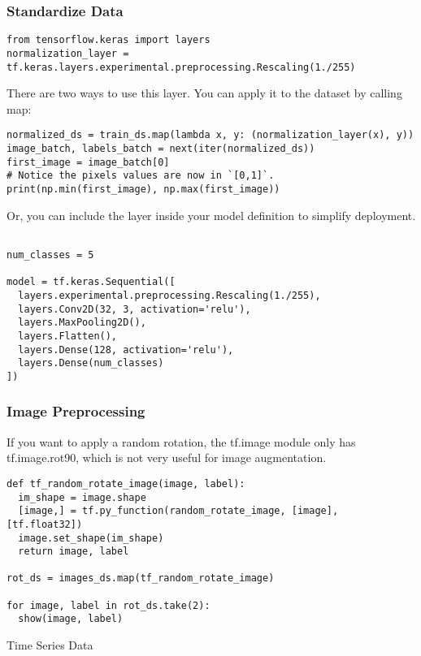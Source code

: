 \begin{frame}[fragile]\frametitle{Standardize Data}

\begin{lstlisting}
from tensorflow.keras import layers
normalization_layer = tf.keras.layers.experimental.preprocessing.Rescaling(1./255)
\end{lstlisting}
There are two ways to use this layer. You can apply it to the dataset by calling map:
\begin{lstlisting}
normalized_ds = train_ds.map(lambda x, y: (normalization_layer(x), y))
image_batch, labels_batch = next(iter(normalized_ds))
first_image = image_batch[0]
# Notice the pixels values are now in `[0,1]`.
print(np.min(first_image), np.max(first_image)) 
\end{lstlisting}
Or, you can include the layer inside your model definition to simplify deployment.
\begin{lstlisting}

num_classes = 5

model = tf.keras.Sequential([
  layers.experimental.preprocessing.Rescaling(1./255),
  layers.Conv2D(32, 3, activation='relu'),
  layers.MaxPooling2D(),
  layers.Flatten(),
  layers.Dense(128, activation='relu'),
  layers.Dense(num_classes)
])
\end{lstlisting}

\end{frame}


\begin{frame}[fragile]\frametitle{Image Preprocessing}

If you want to apply a random rotation, the tf.image module only has tf.image.rot90, which is not very useful for image augmentation.

\begin{lstlisting}
def tf_random_rotate_image(image, label):
  im_shape = image.shape
  [image,] = tf.py_function(random_rotate_image, [image], [tf.float32])
  image.set_shape(im_shape)
  return image, label
	
rot_ds = images_ds.map(tf_random_rotate_image)

for image, label in rot_ds.take(2):
  show(image, label)
\end{lstlisting}
\end{frame}


\begin{frame}
  \begin{center}
    {\Large Time Series Data}
	
  \end{center}
\end{frame}

